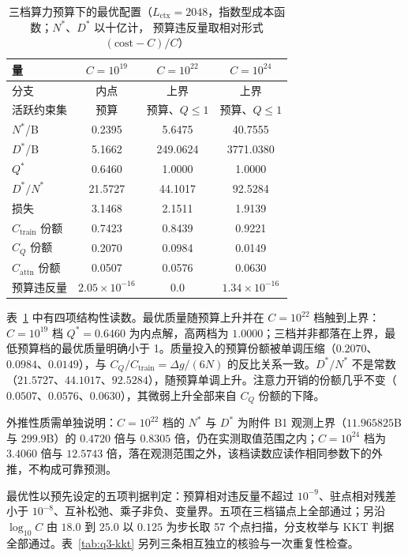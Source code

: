 \begin{table}[H]
  \centering
  \caption{三档算力预算下的最优配置（$L_{\text{ctx}}=2048$，指数型成本函数；$N^{*}$、$D^{*}$ 以十亿计，
  预算违反量取相对形式 $(\text{cost}-C)/C$）}
  \label{tab:q3-anchors}
  \begin{tabular}{@{}lccc@{}}
    \toprule
    量 & $C=10^{19}$ & $C=10^{22}$ & $C=10^{24}$ \\
    \midrule
    分支            & 内点   & 上界   & 上界 \\
    活跃约束集       & 预算   & 预算、$Q\le1$ & 预算、$Q\le1$ \\
    $N^{*}$/B       & 0.2395 & 5.6475 & 40.7555 \\
    $D^{*}$/B       & 5.1662 & 249.0624 & 3771.0380 \\
    $Q^{*}$         & 0.6460 & 1.0000 & 1.0000 \\
    $D^{*}/N^{*}$   & 21.5727 & 44.1017 & 92.5284 \\
    损失            & 3.1468 & 2.1511 & 1.9139 \\
    $C_{\text{train}}$ 份额 & 0.7423 & 0.8439 & 0.9221 \\
    $C_{Q}$ 份额     & 0.2070 & 0.0984 & 0.0149 \\
    $C_{\text{attn}}$ 份额 & 0.0507 & 0.0576 & 0.0630 \\
    预算违反量       & $2.05\times10^{-16}$ & $0.0$ & $1.34\times10^{-16}$ \\
    \bottomrule
  \end{tabular}
\end{table}

表~\ref{tab:q3-anchors} 中有四项结构性读数。最优质量随预算上升并在 $C=10^{22}$ 档触到上界：$C=10^{19}$ 档 $Q^{*}=0.6460$ 为内点解，高两档为 $1.0000$；三档并非都落在上界，最低预算档的最优质量明确小于 1。质量投入的预算份额被单调压缩（$0.2070$、$0.0984$、$0.0149$），与 $C_{Q}/C_{\text{train}}=\Delta g/(6N)$ 的反比关系一致。$D^{*}/N^{*}$ 不是常数（$21.5727$、$44.1017$、$92.5284$），随预算单调上升。注意力开销的份额几乎不变（$0.0507$、$0.0576$、$0.0630$），其微弱上升全部来自 $C_{Q}$ 份额的下降。

外推性质需单独说明：$C=10^{22}$ 档的 $N^{*}$ 与 $D^{*}$ 为附件 B1 观测上界（$11.965825$B 与 $299.9$B）的 $0.4720$ 倍与 $0.8305$ 倍，仍在实测取值范围之内；$C=10^{24}$ 档为 $3.4060$ 倍与 $12.5743$ 倍，落在观测范围之外，该档读数应读作相同参数下的外推，不构成可靠预测。

最优性以预先设定的五项判据判定：预算相对违反量不超过 $10^{-9}$、驻点相对残差小于 $10^{-8}$、互补松弛、乘子非负、变量界。五项在三档锚点上全部通过；另沿 $\log_{10}C$ 由 $18.0$ 到 $25.0$ 以 $0.125$ 为步长取 57 个点扫描，分支枚举与 KKT 判据全部通过。表~\ref{tab:q3-kkt} 另列三条相互独立的核验与一次重复性检查。

